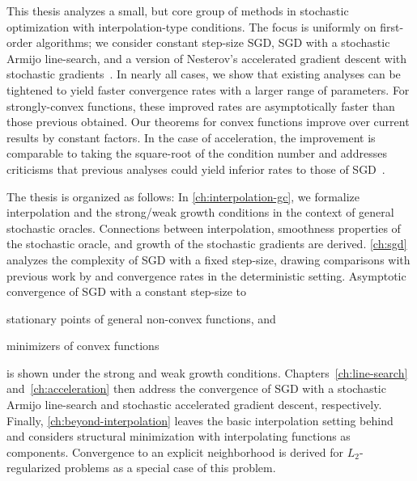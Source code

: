 This thesis analyzes a small, but core group of methods in stochastic optimization with interpolation-type conditions.
The focus is uniformly on first-order algorithms; we consider constant step-size \ac{SGD}, \ac{SGD} with a stochastic Armijo line-search, and a version of Nesterov's accelerated gradient descent with stochastic gradients~\citep{nesterov2004lectures}. 
In nearly all cases, we show that existing analyses can be tightened to yield faster convergence rates with a larger range of parameters. 
For strongly-convex functions, these improved rates are asymptotically faster than those previous obtained.
Our theorems for convex functions improve over current results by constant factors.
In the case of acceleration, the improvement is comparable to taking the square-root of the condition number and addresses criticisms that previous analyses could yield inferior rates to those of \ac{SGD}~\cite{liu2020accelerating}. 

The thesis is organized as follows: 
In \autoref{ch:interpolation-gc}, we formalize interpolation and the strong/weak growth conditions in the context of general stochastic oracles. 
Connections between interpolation, smoothness properties of the stochastic oracle, and growth of the stochastic gradients are derived.
\autoref{ch:sgd} analyzes the complexity of \ac{SGD} with a fixed step-size, drawing comparisons with previous work by \citet{vaswani2019fast} and convergence rates in the deterministic setting. 
Asymptotic convergence of SGD with a constant step-size to
\begin{inparaenum}[(i)]
\item stationary points of general non-convex functions, and
\item minimizers of convex functions 
\end{inparaenum}
is shown under the strong and weak growth conditions.
Chapters~\ref{ch:line-search} and~\ref{ch:acceleration} then address the convergence of \ac{SGD} with a stochastic Armijo line-search and stochastic accelerated gradient descent, respectively. 
Finally, \autoref{ch:beyond-interpolation} leaves the basic interpolation setting behind and considers structural minimization with interpolating functions as components. 
Convergence to an explicit neighborhood is derived for \( L_2 \)-regularized problems as a special case of this problem. 






 


